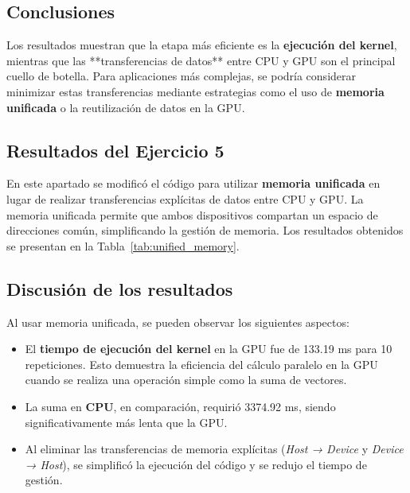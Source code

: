 \documentclass[twocolumn,a4paper,12pt]{article}
\begin{document}
\subsection{Conclusiones}

Los resultados muestran que la etapa más eficiente es la \textbf{ejecución del kernel}, mientras que las **transferencias de datos** entre CPU y GPU son el principal cuello de botella. Para aplicaciones más complejas, se podría considerar minimizar estas transferencias mediante estrategias como el uso de \textbf{memoria unificada} o la reutilización de datos en la GPU.

\subsection{Resultados del Ejercicio 5}

En este apartado se modificó el código para utilizar \textbf{memoria unificada} en lugar de realizar transferencias explícitas de datos entre CPU y GPU. La memoria unificada permite que ambos dispositivos compartan un espacio de direcciones común, simplificando la gestión de memoria. Los resultados obtenidos se presentan en la Tabla~\ref{tab:unified_memory}.

\begin{table}[H]
    \centering
    \caption{Tiempos obtenidos con memoria unificada}
    \label{tab:unified_memory}
\end{table}

\subsection{Discusión de los resultados}

Al usar memoria unificada, se pueden observar los siguientes aspectos:

\begin{itemize}
    \item El \textbf{tiempo de ejecución del kernel} en la GPU fue de 133.19 ms para 10 repeticiones. Esto demuestra la eficiencia del cálculo paralelo en la GPU cuando se realiza una operación simple como la suma de vectores.
    \item La suma en \textbf{CPU}, en comparación, requirió 3374.92 ms, siendo significativamente más lenta que la GPU.
    \item Al eliminar las transferencias de memoria explícitas (\textit{Host → Device} y \textit{Device → Host}), se simplificó la ejecución del código y se redujo el tiempo de gestión.
\end{itemize}
\end{document}

